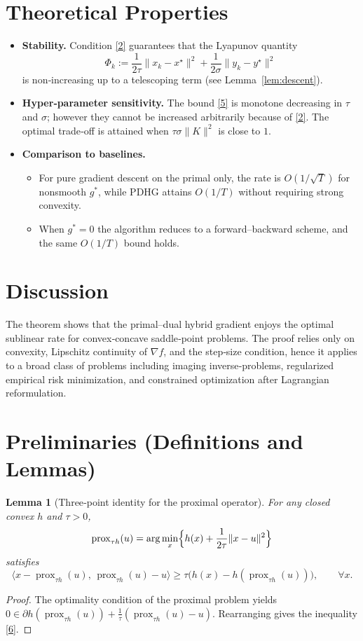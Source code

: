 \documentclass{article}
\newtheorem{lemma}{Lemma}
\begin{document}
\section*{Theoretical Properties}
\begin{itemize}
\item \textbf{Stability.} Condition \eqref{2} guarantees that the Lyapunov
  quantity
  \[
  \Phi_{k}:=\frac{1}{2\tau}\|x_{k}-x^{\star}\|^{2}
           +\frac{1}{2\sigma}\|y_{k}-y^{\star}\|^{2}
  \]
  is non‑increasing up to a telescoping term (see Lemma~\ref{lem:descent}).
\item \textbf{Hyper‑parameter sensitivity.} The bound \eqref{5} is
  monotone decreasing in $\tau$ and $\sigma$; however they cannot be increased
  arbitrarily because of \eqref{2}. The optimal trade‑off is attained when
  $\tau\sigma\|K\|^{2}$ is close to $1$.
\item \textbf{Comparison to baselines.}
  \begin{itemize}
    \item For pure gradient descent on the primal only, the rate is $O(1/\sqrt{T})$
      for nonsmooth $g^{*}$, while PDHG attains $O(1/T)$ without requiring
      strong convexity.
    \item When $g^{*}=0$ the algorithm reduces to a forward–backward scheme,
      and the same $O(1/T)$ bound holds.
  \end{itemize}
\end{itemize}

\section*{Discussion}
The theorem shows that the primal–dual hybrid gradient enjoys the optimal
sublinear rate for convex‑concave saddle‑point problems. The proof relies only
on convexity, Lipschitz continuity of $\nabla f$, and the step‑size condition,
hence it applies to a broad class of problems including imaging
inverse‑problems, regularized empirical risk minimization, and constrained
optimization after Lagrangian reformulation.

\newpage
\section*{Preliminaries (Definitions and Lemmas)}
\begin{lemma}[Three‑point identity for the proximal operator]\label{lem:prox}
For any closed convex $h$ and $\tau>0$,
\[
\operatorname{prox}_{\tau h}(u)=\arg\min_{x}\Bigl\{h(x)+\frac{1}{2\tau}\|x-u\|^{2}\Bigr\}
\]
satisfies
\[
\langle x-\operatorname{prox}_{\tau h}(u),\,\operatorname{prox}_{\tau h}(u)-u\rangle
\ge \tau\bigl( h(x)-h(\operatorname{prox}_{\tau h}(u))\bigr),
\qquad\forall x .
\tag{6}
\]
\end{lemma}
\begin{proof}
The optimality condition of the proximal problem yields
$0\in \partial h(\operatorname{prox}_{\tau h}(u)) +\frac{1}{\tau}
(\operatorname{prox}_{\tau h}(u)-u)$. Rearranging gives the inequality \eqref{6}.
\end{proof}
\end{document}
